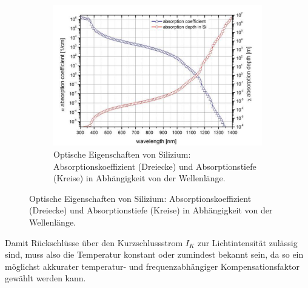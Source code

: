 \begin{figure}[H]
\begin{subfigure}[b]{0.55\textwidth}
    \caption{Silizium-Eindringtiefe-Licht \cite{laser}}
    \includegraphics[width=\textwidth]{img/Silizium-Eindringtiefe-Licht.png}
    \caption*{ Optische Eigenschaften von Silizium: Absorptionskoeffizient (Dreiecke) und Absorptionstiefe (Kreise) in Abhängigkeit von der Wellenlänge.}
  \label{fig:Silizium-eindingtiefe}
  \end{subfigure}
\end{figure}







\noindent Damit Rückschlüsse über den Kurzschlussstrom $I_K$ zur Lichtintensität zulässig sind, muss also die Temperatur konstant oder zumindest bekannt sein, da so ein möglichst akkurater temperatur- und frequenzabhängiger Kompensationsfaktor gewählt werden kann.

\newpage
